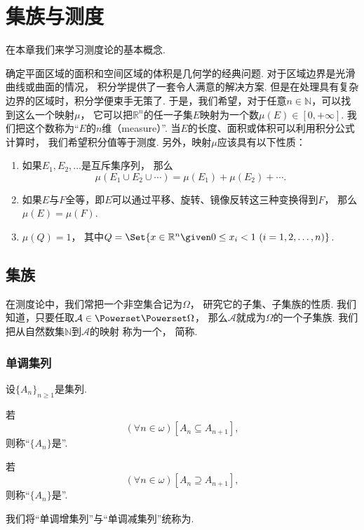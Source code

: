 \chapter{集族与测度}
在本章我们来学习测度论的基本概念.

确定平面区域的面积和空间区域的体积是几何学的经典问题.
对于区域边界是光滑曲线或曲面的情况，
积分学提供了一套令人满意的解决方案.
但是在处理具有复杂边界的区域时，积分学便束手无策了.
于是，我们希望，对于任意\(n\in\mathbb{N}\)，可以找到这么一个映射\(\mu\)，
它可以把\(\mathbb{R}^n\)的任一子集\(E\)映射为一个数\(\mu(E) \in [0,+\infty]\).
我们把这个数称为“\(E\)的\(n\)维（measure）”.
当\(E\)的长度、面积或体积可以利用积分公式计算时，
我们希望积分值等于测度.
另外，映射\(\mu\)应该具有以下性质：\begin{enumerate}
	\item 如果\(E_1,E_2,\dotsc\)是互斥集序列，
	那么\[
		\mu(E_1 \cup E_2 \cup \dotsb)
		= \mu(E_1) + \mu(E_2) + \dotsb.
	\]

	\item 如果\(E\)与\(F\)全等，即\(E\)可以通过平移、旋转、镜像反转这三种变换得到\(F\)，
	那么\(\mu(E) = \mu(F)\).

	\item \(\mu(Q)=1\)，
	其中\(Q = \Set{ x\in\mathbb{R}^n \given 0\leq x_i<1\ (i=1,2,\dotsc,n) }\).
\end{enumerate}

\section{集族}
在测度论中，我们常把一个非空集合记为\(\Omega\)，
研究它的子集、子集族的性质.
我们知道，只要任取\(\mathcal{A} \in \Powerset\Powerset\Omega\)，
那么\(\mathcal{A}\)就成为\(\Omega\)的一个子集族.
我们把从自然数集\(\mathbb{N}\)到\(\mathcal{A}\)的映射
称为一个，
简称.

\subsection{单调集列}
\begin{definition}
设\(\{A_n\}_{n\geq1}\)是集列.

若\[
	(\forall n\in\omega)
	[A_n \subseteq A_{n+1}],
\]
则称“\(\{A_n\}\)是”.

若\[
	(\forall n\in\omega)
	[A_n \supseteq A_{n+1}],
\]
则称“\(\{A_n\}\)是”.

我们将“单调增集列”与“单调减集列”统称为.
\end{definition}

